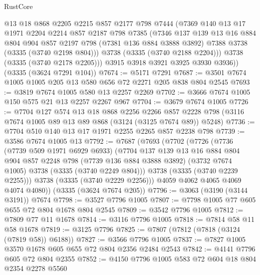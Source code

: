\begin{lexlean}{RustCore}
\begin{coremodule}
          @13
          @18
          @868
          @2205
          @2215
          @857
          @2177
          @798
          @7444
          (@7369
            @140
            @13
            @17
            @1971
            @2204
            @2214
            @857
            @2187
            @798
            @7385
            (@7346
              @137
              @139
              @13
              @16
              @884
              @804
              @904
              @857
              @2197
              @798
              (@7381 @136 @884 @3888 @3892)
              @7388
              @3738
              (@3335 (@3740 @2198 @804)))
            @3738
            (@3335 (@3740 @2188 @2204)))
          @3738
          (@3335 (@3740 @2178 @2205)))
        @3915
        @3918
        @3921
        @3925
        @3930
        @3936))
    (@3335 (@3624 @7291 @104))
@7674 := @5171 @7291
@7687 := @3501 @7674 @1005 @1005 @205 @13 @580 @656 @72 @2271 @205 @838 @804 @2545
@7693 := @3819 @7674 @1005 @580 @13 @2257 @2269
@7702 := @3666 @7674 @1005 @150 @575 @21 @13 @2257 @2267 @967
@7704 := @3679 @7674 @1005
@7726 := @7704
    @127
    @574
    @13
    @18
    @868
    @2256
    @2266
    @857
    @2228
    @798
    (@3116 @7674 @1005 @89 @13 @89 @868 (@3124 (@3125 @7674 @89)) @5248)
@7736 := @7704 @510 @140 @13 @17 @1971 @2255 @2265 @857 @2238 @798
@7739 := @3586 @7674 @1005 @13
@7792 := @7687
    (@7693
      (@7702
        (@7726
          (@7736
            (@7739 @509 @1971 @6929 @6933)
            (@7704
              @137
              @139
              @13
              @16
              @884
              @804
              @904
              @857
              @2248
              @798
              (@7739 @136 @884 @3888 @3892)
              (@3732 @7674 @1005)
              @3738
              (@3335 (@3740 @2249 @804)))
            @3738
            (@3335 (@3740 @2239 @2255)))
          @3738
          (@3335 (@3740 @2229 @2256)))
        @4059
        @4062
        @4065
        @4069
        @4074
        @4080))
    (@3335 (@3624 @7674 @205))
@7796 := @3063 (@3190 (@3144 @3191)) @7674
@7798 := @3527 @7796 @1005
@7807 := @7798 @1005 @77 @605 @655 @72 @804 @1678 @804 @2545
@7809 := @3542 @7796 @1005
@7812 := @7809 @77 @11 @1678
@7814 := @3116 @7796 @1005
@7818 := @7814 @58 @11 @58 @1678
@7819 := @3125 @7796
@7825 := @7807 (@7812 (@7818 (@3124 (@7819 @58)) @6188))
@7827 := @3566 @7796 @1005
@7837 := @7827 @1005 @3570 @1678 @605 @655 @72 @804 @2356 @2484 @2543
@7842 := @4141 @7796 @605 @72 @804 @2355
@7852 := @4150 @7796 @1005 @583 @72 @604 @18 @804 @2354 @2278 @5560

\end{coremodule}
\end{lexlean}
